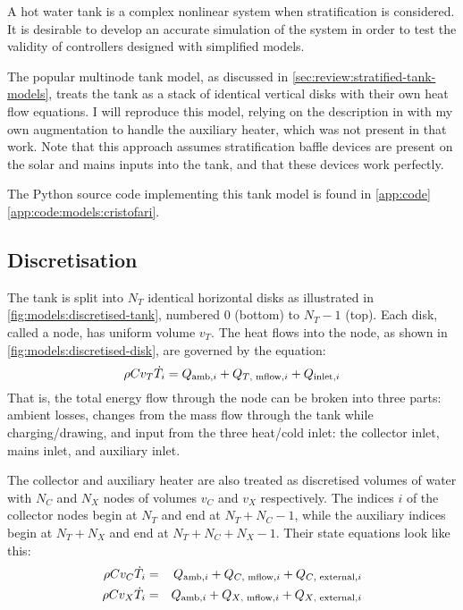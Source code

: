 A hot water tank is a complex nonlinear system when stratification is considered.
It is desirable to develop an accurate simulation of the system in order to test the validity of controllers designed with simplified models.

The popular multinode tank model, as discussed in \autoref{sec:review:stratified-tank-models}, treats the tank as a stack of identical vertical disks with their own heat flow equations.
I will reproduce this model, relying on the description in \textcite{Cristofari02} with my own augmentation to handle the auxiliary heater, which was not present in that work.
Note that this approach assumes stratification baffle devices are present on the solar and mains inputs into the tank, and that these devices work perfectly.

The Python source code implementing this tank model is found in \autoref{app:code} \autoref{app:code:models:cristofari}.

\subsection{Discretisation}

The tank is split into $N_T$ identical horizontal disks as illustrated in \autoref{fig:models:discretised-tank}, numbered $0$ (bottom) to $N_T-1$ (top).
Each disk, called a node, has uniform volume $v_T$.
The heat flows into the node, as shown in \autoref{fig:models:discretised-disk}, are governed by the equation:
\begin{equation}
   \label{eq:tank-node-dT}
   \rho C v_T \dot{T}_i = Q_{\text{amb}, i} + Q_{\text{$T$, mflow}, i} + Q_{\text{inlet}, i}
\end{equation}
That is, the total energy flow through the node can be broken into three parts: ambient losses, changes from the mass flow through the tank while charging/drawing, and input from the three heat/cold inlet: the collector inlet, mains inlet, and auxiliary inlet.

The collector and auxiliary heater are also treated as discretised volumes of water with $N_C$ and $N_X$ nodes of volumes $v_C$ and $v_X$ respectively.
The indices $i$ of the collector nodes begin at $N_T$ and end at $N_T+N_C-1$, while the auxiliary indices begin at $N_T+N_X$ and end at $N_T+N_C+N_X-1$.
Their state equations look like this:
\begin{eqnarray}
   \label{eq:coll-node-dT}
   \rho C v_C \dot{T}_i &=& Q_{\text{amb}, i} + Q_{\text{$C$, mflow}, i} + Q_{\text{$C$, external}, i} \\
   \label{eq:aux-node-dT}
   \rho C v_X \dot{T}_i &=& Q_{\text{amb}, i} + Q_{\text{$X$, mflow}, i} + Q_{\text{$X$, external}, i} \\
\end{eqnarray}


